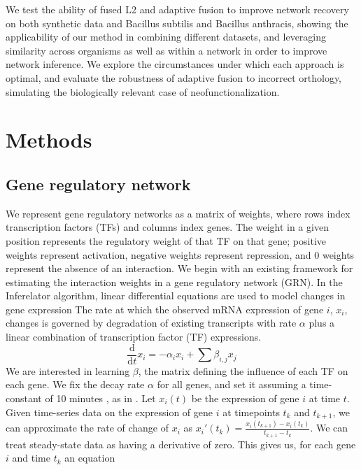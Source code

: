 \documentclass[11pt]{article}
\begin{document}
We test the ability of fused L2 and adaptive fusion to improve network recovery on both synthetic data and Bacillus subtilis and Bacillus anthracis, showing the applicability of our method in combining different datasets, and leveraging similarity across organisms as well as within a network in order to improve network inference. We explore the circumstances under which each approach is optimal, and evaluate the robustness of adaptive fusion to incorrect orthology, simulating the biologically relevant case of neofunctionalization. 

\section{Methods}
\subsection{Gene regulatory network}
We represent gene regulatory networks as a matrix of weights, where rows index transcription factors (TFs) and columns index genes. The weight in a given position represents the regulatory weight of that TF on that gene; positive weights represent activation, negative weights represent repression, and 0 weights represent the absence of an interaction. We begin with an existing framework for estimating the interaction weights in a gene regulatory network (GRN). In the Inferelator algorithm, linear differential equations are used to model changes in gene expression \cite{bonneau_inferelator:_2006-1} The rate at which the observed mRNA expression of gene $i$, $x_i$, changes is governed by degradation of existing transcripts with rate $\alpha$ plus a linear combination of transcription factor (TF) expressions. 
\begin{equation}
\frac{\mathrm d}{\mathrm d t} x_i = -\alpha_{i}x_{i} + \sum \beta_{i,j}x_{j}
\end{equation}
We are interested in learning $\beta$, the matrix defining the influence of each TF on each gene. We fix the decay rate $\alpha$ for all genes, and set it assuming a time-constant of 10 minutes \cite{hambraeus_genome-wide_2003, selinger_global_2003}, as in \cite{greenfield_robust_2013}. Let $x_i(t)$ be the expression of gene $i$ at time $t$. Given time-series data on the expression of gene $i$ at timepoints $t_k$ and $t_{k+1}$, we can approximate the rate of change of $x_i$ as $x_i'(t_k)=\frac{x_i(t_{k+1})-x_i(t_k)}{t_{k+1}-t_k}$. We can treat steady-state data as having a derivative of zero. This gives us, for each gene $i$ and time $t_{k}$ an equation
\end{document}
